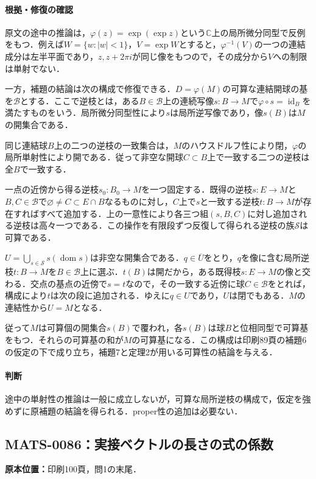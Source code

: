 \documentclass[a4paper,10pt]{ltjsarticle}
\begin{document}
\paragraph{根拠・修復の確認}原文の途中の推論は，$\varphi(z)=\exp(\exp z)$という$\mathbb C$上の局所微分同型で反例をもつ．例えば$W=\{w:|w|<1\}$，$V=\exp W$とすると，$\varphi^{-1}(V)$の一つの連結成分は左半平面であり，$z,z+2\pi i$が同じ像をもつので，その成分から$V$への制限は単射でない．

一方，補題の結論は次の構成で修復できる．$D=\varphi(M)$の可算な連結開球の基を$\mathcal B$とする．ここで逆枝とは，ある$B\in\mathcal B$上の連続写像$s:B\to M$で$\varphi\circ s=\operatorname{id}_B$を満たすものをいう．局所微分同型性により$s$は局所逆写像であり，像$s(B)$は$M$の開集合である．

同じ連結球$B$上の二つの逆枝の一致集合は，$M$のハウスドルフ性により閉，$\varphi$の局所単射性により開である．従って非空な開球$C\subset B$上で一致する二つの逆枝は全$B$で一致する．

一点の近傍から得る逆枝$s_0:B_0\to M$を一つ固定する．既得の逆枝$s:E\to M$と$B,C\in\mathcal B$で$\varnothing\ne C\subset E\cap B$なるものに対し，$C$上で$s$と一致する逆枝$t:B\to M$が存在すればすべて追加する．上の一意性により各三つ組$(s,B,C)$に対し追加される逆枝は高々一つである．この操作を有限段ずつ反復して得られる逆枝の族$\mathcal S$は可算である．

$U=\bigcup_{s\in\mathcal S}s(\operatorname{dom}s)$は非空な開集合である．$q\in\overline U$をとり，$q$を像に含む局所逆枝$t:B\to M$を$B\in\mathcal B$上に選ぶ．$t(B)$は開だから，ある既得枝$s:E\to M$の像と交わる．交点の基点の近傍で$s=t$なので，その一致する近傍に球$C\in\mathcal B$をとれば，構成により$t$は次の段に追加される．ゆえに$q\in U$であり，$U$は閉でもある．$M$の連結性から$U=M$となる．

従って$M$は可算個の開集合$s(B)$で覆われ，各$s(B)$は球$B$と位相同型で可算基をもつ．それらの可算基の和が$M$の可算基になる．この構成は印刷89頁の補題6の仮定の下で成り立ち，補題7と定理2が用いる可算性の結論を与える．

\paragraph{判断}途中の単射性の推論は一般に成立しないが，可算な局所逆枝の構成で，仮定を強めずに原補題の結論を得られる．proper性の追加は必要ない．


\subsection*{MATS-0086：実接ベクトルの長さの式の係数}\label{math:MATS-0086}
\noindent\textbf{原本位置：}印刷100頁，問1の末尾．
\end{document}
